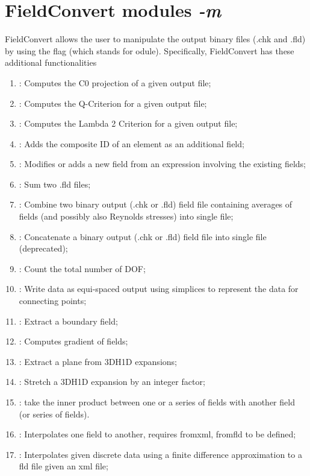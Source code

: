 \section{FieldConvert modules \textit{-m}}
FieldConvert allows the user to manipulate the \nekpp output
binary files (.chk and .fld) by using the flag  (which
stands for odule).
Specifically, FieldConvert has these additional functionalities
%
\begin{enumerate}
\item {}: Computes the C0 projection of a given output file;
\item {}: Computes the Q-Criterion for a given output file;
\item {}: Computes the Lambda 2 Criterion for a given output file;
\item {}: Adds the composite ID of an element as an additional field;
\item {}: Modifies or adds a new field from an expression involving the existing fields;
\item {}: Sum two .fld files;
\item {}: Combine two \nekpp binary output (.chk or .fld) field file containing averages of fields (and
possibly also Reynolds stresses) into single file;
\item {}: Concatenate a \nekpp binary output (.chk or .fld) field file into single file (deprecated);
\item {}: Count the total number of DOF;
\item {}: Write data as equi-spaced output using simplices to represent the data for connecting points;
\item {}: Extract a boundary field;
\item {}: Computes gradient of fields;
\item {}: Extract a plane from 3DH1D expansions;
\item {}: Stretch a 3DH1D expansion by an integer factor;
\item {}: take the inner product between one or a series of fields with another field (or series of fields).
\item {}: Interpolates one field to another, requires fromxml, fromfld to be defined;
\item {}: Interpolates given discrete data using a finite difference approximation to a fld file given an xml file;

\end{enumerate}

